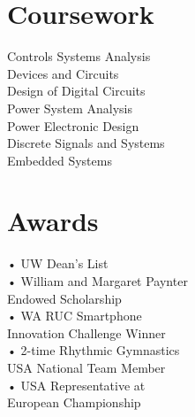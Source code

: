\documentclass[]{hieudo-build}
\begin{document}
\begin{minipage}[t]{0.29\textwidth}
\section{Coursework}
Controls Systems Analysis \\
Devices and Circuits\\
Design of Digital Circuits \\
Power System Analysis \\
Power Electronic Design \\
Discrete Signals and Systems\\
Embedded Systems
\sectionsep



\section{Awards} 
• UW Dean's List\\
• William and Margaret Paynter\\
\hspace{1.5 mm} Endowed Scholarship\\
• WA RUC Smartphone \\
\hspace{1.5 mm} Innovation Challenge Winner\\
• 2-time Rhythmic Gymnastics\\
\hspace{1.5 mm} USA National Team Member\\
• USA Representative at \\
\hspace{1.5 mm} European Championship\\
\sectionsep


%
%
\end{minipage} 
\hfill
\end{document}
